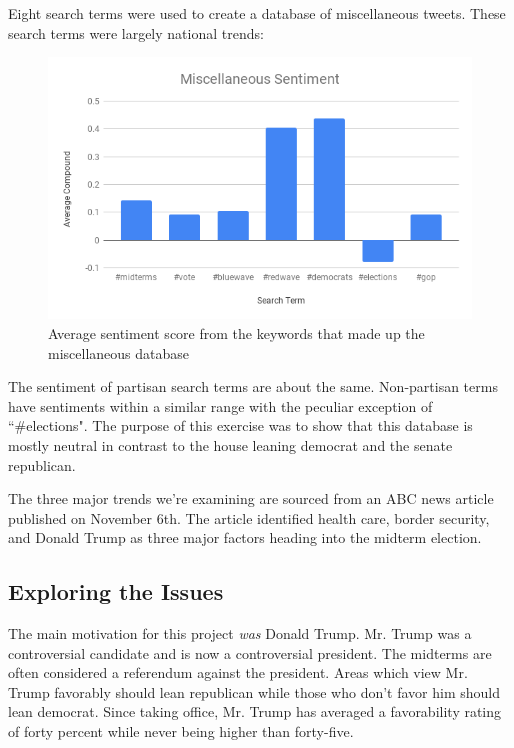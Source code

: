 \documentclass[11pt, twoside, reqno]{book}
\begin{document}
Eight search terms were used to create a database of miscellaneous tweets. These search terms were largely national trends:

\begin{figure}[H]
	\centering
	\includegraphics[scale=0.5]{misc_sent}
	\caption{Average sentiment score from the keywords that made up the miscellaneous database}\label{fig:miscc_sent}
\end{figure}

The sentiment of partisan search terms are about the same. Non-partisan terms have sentiments within a similar range with the peculiar exception of ``\#elections". The purpose of this exercise was to show that this database is mostly neutral in contrast to the house leaning democrat and the senate republican. 

The three major trends we're examining are sourced from an ABC news article published on November 6th. The article identified health care, border security, and Donald Trump as three major factors heading into the midterm election\cite{abc_news_2018}.

\subsection{Exploring the Issues}
\label{subsec:exploring the issues}
\hspace{0.2in}The main motivation for this project \textit{was} Donald Trump. Mr. Trump was a controversial candidate and is now a controversial president. The midterms are often considered a referendum against the president. Areas which view Mr. Trump favorably should lean republican while those who don't favor him should lean democrat. Since taking office, Mr. Trump has averaged a favorability rating of forty percent while never being higher than forty-five\cite{gallup}. 
\end{document}
